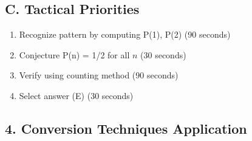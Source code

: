 \documentclass[11pt]{article}
\begin{document}
\begin{tacticalbox}
\subsection*{C. Tactical Priorities}
\begin{enumerate}[leftmargin=*]
    \item Recognize pattern by computing P(1), P(2) (90 seconds)
    \item Conjecture P(n) = 1/2 for all $n$ (30 seconds)
    \item Verify using counting method (90 seconds)
    \item Select answer (E) (30 seconds)
\end{enumerate}
\end{tacticalbox}

\begin{conversionbox}
\section*{4. Conversion Techniques Application}


\end{conversionbox}
\end{document}

